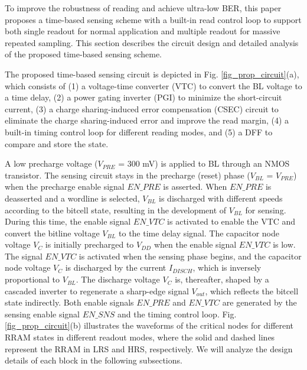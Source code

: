 To improve the robustness of reading and achieve ultra-low BER, this paper proposes a time-based sensing scheme with a built-in read control loop to support both single readout for normal application and multiple readout for massive repeated sampling.
This section describes the circuit design and detailed analysis of the proposed time-based sensing scheme.

The proposed time-based sensing circuit is depicted in Fig. \ref{fig_prop_circuit}(a), which consists of (1) a voltage-time converter (VTC) to convert the BL voltage to a time delay, (2) a power gating inverter (PGI) to minimize the short-circuit current, (3) a charge sharing-induced error compensation (CSEC) circuit to eliminate the charge sharing-induced error and improve the read margin, (4) a built-in timing control loop for different reading modes, and (5) a DFF to compare and store the state. 

A low precharge voltage ($V_{PRE}$ = 300 mV) is applied to BL through an NMOS transistor. The sensing circuit stays in the precharge (reset) phase ($V_{BL}$ = $V_{PRE}$) when the precharge enable signal $EN\_PRE$ is asserted. When $EN\_PRE$ is deasserted and a wordline is selected, $V_{BL}$ is discharged with different speeds according to the bitcell state, resulting in the development of $V_{BL}$ for sensing. During this time, the enable signal $EN\_VTC$ is activated to enable the VTC and convert the bitline voltage $V_{BL}$ to the time delay signal. The capacitor node voltage $V_C$ is initially precharged to $V_{DD}$ when the enable signal $EN\_VTC$ is low. The signal $EN\_VTC$ is activated when the sensing phase begins, and the capacitor node voltage $V_C$ is discharged by the current $I_{DISCH}$, which is inversely proportional to $V_{BL}$. The discharge voltage $V_C$ is, thereafter, shaped by a cascaded inverter to regenerate a sharp-edge signal $V_{out}$, which reflects the bitcell state indirectly. 
Both enable signals $EN\_PRE$ and $EN\_VTC$ are generated by the sensing enable signal  $EN\_SNS$ and the timing control loop. 
Fig. \ref{fig_prop_circuit}(b) illustrates the waveforms of the critical nodes for different RRAM states in different readout modes, where the solid and dashed lines represent the RRAM in LRS and HRS, respectively.
We will analyze the design details of each block in the following subsections.


